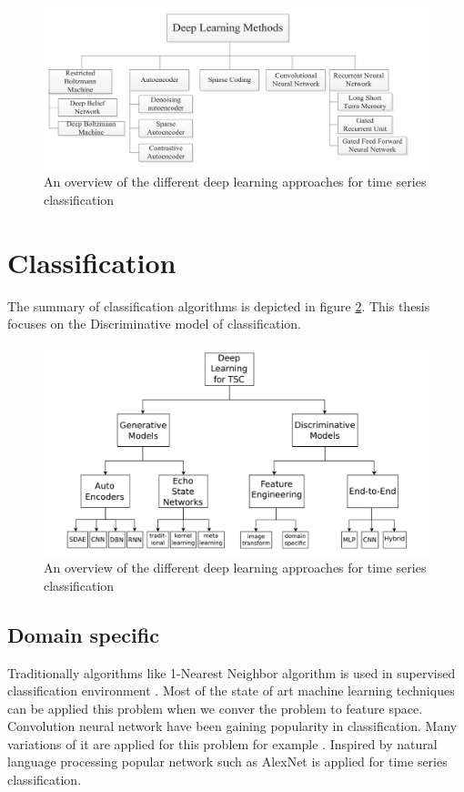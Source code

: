      \begin{figure}[h]
     	\centering
     	\includegraphics[width=1\linewidth]{images/dlm.png}
     	\caption{An overview of the different deep learning approaches for time series classification \cite{nweke2018deep}}
     	\label{l01}
     \end{figure}
     
     
     \section{Classification}
     The summary of classification algorithms is depicted in figure \ref{l0}. This thesis focuses on the Discriminative model of classification.
     
      \begin{figure}[h]
      	\centering
      	\includegraphics[width=1\linewidth]{images/tsc.png}
      	\caption{An overview of the different deep learning approaches for time series classification \cite{ismail2019deep}}
      	\label{l0}
      \end{figure}
     
     \subsection{Domain specific}
     Traditionally algorithms like 1-Nearest Neighbor algorithm is used in supervised classification environment \cite{bagnall2012transformation}. Most of the state of art machine learning techniques can be applied this problem when we conver the problem to feature space. 
    Convolution neural network have been gaining popularity in classification. Many variations of it are applied for this problem for example \cite{wang2017time}. 
     Inspired by natural language processing popular network such as AlexNet \cite{alom2018history} is applied for time series classification.
     
